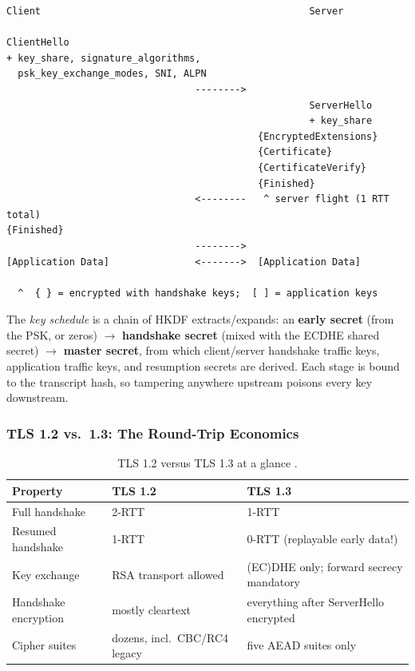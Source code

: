\begin{verbatim}
Client                                               Server

ClientHello
+ key_share, signature_algorithms,
  psk_key_exchange_modes, SNI, ALPN
                                 -------->
                                                     ServerHello
                                                     + key_share
                                            {EncryptedExtensions}
                                            {Certificate}
                                            {CertificateVerify}
                                            {Finished}
                                 <--------   ^ server flight (1 RTT total)
{Finished}
                                 -------->
[Application Data]               <------->  [Application Data]

  ^  { } = encrypted with handshake keys;  [ ] = application keys
\end{verbatim}

The \emph{key schedule} is a chain of HKDF extracts/expands: an \textbf{early secret} (from the PSK, or zeros) $\rightarrow$ \textbf{handshake secret} (mixed with the ECDHE shared secret) $\rightarrow$ \textbf{master secret}, from which client/server handshake traffic keys, application traffic keys, and resumption secrets are derived. Each stage is bound to the transcript hash, so tampering anywhere upstream poisons every key downstream.

\subsubsection{TLS 1.2 vs.\ 1.3: The Round-Trip Economics}

\begin{table}[h]
  \centering
  \small
  \begin{tabularx}{\textwidth}{l l X}
    \toprule
    \textbf{Property} & \textbf{TLS 1.2} & \textbf{TLS 1.3} \\
    \midrule
    Full handshake & 2-RTT & 1-RTT \\
    Resumed handshake & 1-RTT & 0-RTT (replayable early data!) \\
    Key exchange & RSA transport allowed & (EC)DHE only; forward secrecy mandatory \\
    Handshake encryption & mostly cleartext & everything after ServerHello encrypted \\
    Cipher suites & dozens, incl.\ CBC/RC4 legacy & five AEAD suites only \\
    \bottomrule
  \end{tabularx}
  \caption{TLS 1.2 versus TLS 1.3 at a glance \cite{rfc8446}.}
  \label{tab:tls}
\end{table}

